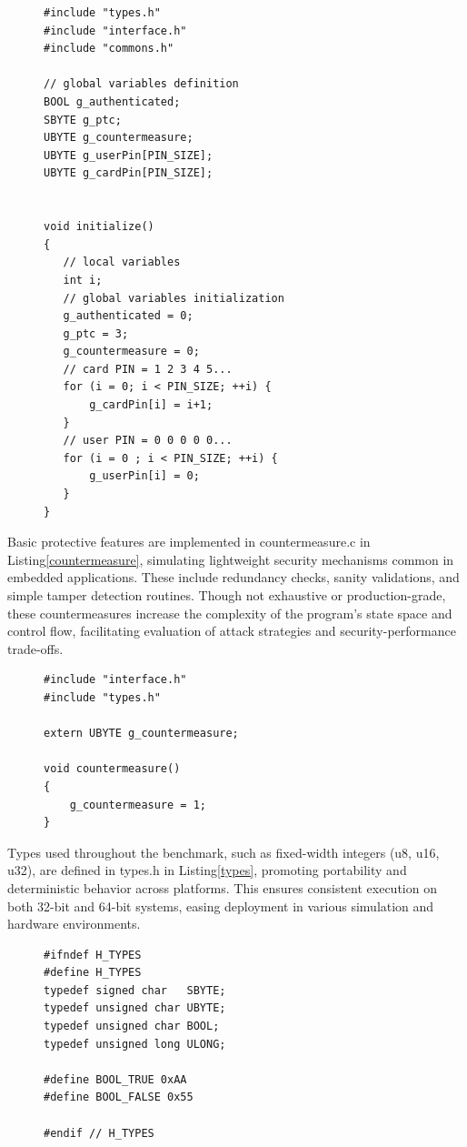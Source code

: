 \begin{figure}
\begin{lstlisting}[caption={initialize.c of VerifyPin function in benchmark V0}, label={initialize}, basicstyle=\ttfamily\footnotesize]
#include "types.h"
#include "interface.h"
#include "commons.h"

// global variables definition
BOOL g_authenticated;
SBYTE g_ptc;
UBYTE g_countermeasure;
UBYTE g_userPin[PIN_SIZE];
UBYTE g_cardPin[PIN_SIZE];


void initialize()
{
   // local variables
   int i;
   // global variables initialization
   g_authenticated = 0;
   g_ptc = 3;
   g_countermeasure = 0;
   // card PIN = 1 2 3 4 5...
   for (i = 0; i < PIN_SIZE; ++i) {
       g_cardPin[i] = i+1;
   }
   // user PIN = 0 0 0 0 0...
   for (i = 0 ; i < PIN_SIZE; ++i) {
       g_userPin[i] = 0;
   }
}
\end{lstlisting}
\end{figure}
Basic protective features are implemented in countermeasure.c in Listing\ref{countermeasure}, simulating lightweight security mechanisms common in embedded applications. These include redundancy checks, sanity validations, and simple tamper detection routines. Though not exhaustive or production-grade, these countermeasures increase the complexity of the program’s state space and control flow, facilitating evaluation of attack strategies and security-performance trade-offs.
\begin{figure}
\begin{lstlisting}[caption={countermeasure.c of VerifyPin function in benchmark V0}, label={countermeasure}, basicstyle=\ttfamily\footnotesize]
#include "interface.h"
#include "types.h"

extern UBYTE g_countermeasure;

void countermeasure()
{
    g_countermeasure = 1;
}
\end{lstlisting}
\end{figure}
Types used throughout the benchmark, such as fixed-width integers (u8, u16, u32), are defined in types.h in Listing\ref{types}, promoting portability and deterministic behavior across platforms. This ensures consistent execution on both 32-bit and 64-bit systems, easing deployment in various simulation and hardware environments.
\begin{figure}
\begin{lstlisting}[caption={types.c of VerifyPin function in benchmark V0}, label={types}, basicstyle=\ttfamily\footnotesize]
#ifndef H_TYPES
#define H_TYPES
typedef signed char   SBYTE;
typedef unsigned char UBYTE;
typedef unsigned char BOOL;
typedef unsigned long ULONG;

#define BOOL_TRUE 0xAA
#define BOOL_FALSE 0x55

#endif // H_TYPES
\end{lstlisting}
\end{figure}

